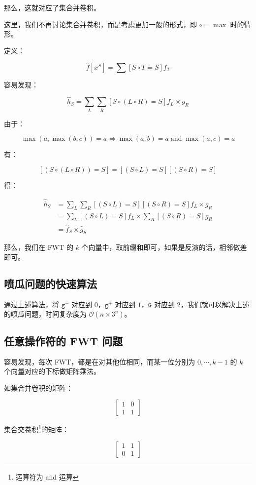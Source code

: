 \documentclass{article}
\begin{document}
那么，这就对应了集合并卷积。

这里，我们不再讨论集合并卷积，而是考虑更加一般的形式，即 $\circ = \max$ 时的情形。

定义：

$$\hat f[x^S]=\sum[S \circ T=S] f_T$$

容易发现：

$$\hat h_S=\sum_{L}\sum_{R}[S \circ (L \circ R) = S] f_L \times g_R$$

由于：

$$\max(a,\max(b,c))=a \Leftrightarrow \max(a,b)=a \operatorname{and} \max(a,c)=a$$

有：

$$[(S \circ (L \circ R))=S]=[(S \circ L) =S][(S \circ R)=S]$$

得：

$$\begin{aligned} \hat h_S &= \sum_{L} \sum_{R} [(S \circ L) =S][(S \circ R)=S] f_L \times g_R \\ &= \sum_{L} [(S \circ L)=S] f_L \times \sum_{R} [(S \circ R)=S] g_R \\ &= \hat f_S \times \hat g_S\end{aligned}$$


那么，我们在 FWT 的 $k$ 个向量中，取前缀和即可，如果是反演的话，相邻做差即可。

\subsection{喷瓜问题的快速算法}

通过上述算法，将 $\texttt{g}^-$ 对应到 $0$，$\texttt{g}^+$ 对应到 $1$，$\texttt{G}$ 对应到 $2$，我们就可以解决上述的喷瓜问题，时间复杂度为 $\mathcal O(n \times 3^n)$。

\subsection{任意操作符的 FWT 问题}

容易发现，每次 FWT，都是在对其他位相同，而某一位分别为 $0, \cdots ,k-1$ 的 $k$ 个向量对应的下标做矩阵乘法。

如集合并卷积的矩阵：

$$\begin{bmatrix} 1 & 0 \\ 1 & 1 \end{bmatrix}$$

集合交卷积\footnote{运算符为 and 运算}的矩阵：

$$\begin{bmatrix} 1 & 1 \\ 0 & 1 \end{bmatrix}$$
\end{document}
